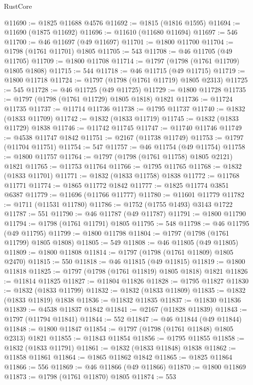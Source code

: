 \begin{lexlean}{RustCore}
\begin{coremodule}
@11690 := @1825 @11688 @4576
@11692 := @1815 (@1816 @1595)
@11694 := @11690 (@1875 @11692)
@11696 := @11610 (@11680 @11694)
@11697 := 546
@11700 := @46 @11697 (@49 @11697)
@11701 := @1800 @11700
@11704 := @1798 (@1761 @11701) @1805
@11705 := 543
@11708 := @46 @11705 (@49 @11705)
@11709 := @1800 @11708
@11714 := @1797 (@1798 (@1761 @11709) @1805 @1808)
@11715 := 544
@11718 := @46 @11715 (@49 @11715)
@11719 := @1800 @11718
@11724 := @1797 (@1798 (@1761 @11719) @1805 @2313)
@11725 := 545
@11728 := @46 @11725 (@49 @11725)
@11729 := @1800 @11728
@11735 := @1797 (@1798 (@1761 @11729) @1805 @1818) @1821
@11736 := @11724 @11735
@11737 := @11714 @11736
@11738 := @1795 @11737
@11740 := @1832 (@1833 @11709)
@11742 := @1832 (@1833 @11719)
@11745 := @1832 (@1833 @11729) @1838
@11746 := @11742 @11745
@11747 := @11740 @11746
@11749 := @4538 @11747 @1842
@11751 := @2167 (@11738 @11749)
@11753 := @1797 (@11704 @11751)
@11754 := 547
@11757 := @46 @11754 (@49 @11754)
@11758 := @1800 @11757
@11764 := @1797 (@1798 (@1761 @11758) @1805 @2121) @1821
@11765 := @11753 @11764
@11766 := @1795 @11765
@11768 := @1832 (@1833 @11701)
@11771 := @1832 (@1833 @11758) @1838
@11772 := @11768 @11771
@11774 := @1865 @11772 @1842
@11777 := @1825 @11774 @3851 @6387
@11779 := @11696 (@11766 @11777)
@11780 := @11601 @11779
@11782 := @1711 (@11531 @11780)
@11786 := @1752 (@1755 @1493) @3143 @1722
@11787 := 551
@11790 := @46 @11787 (@49 @11787)
@11791 := @1800 @11790
@11794 := @1798 (@1761 @11791) @1805
@11795 := 548
@11798 := @46 @11795 (@49 @11795)
@11799 := @1800 @11798
@11804 := @1797 (@1798 (@1761 @11799) @1805 @1808)
@11805 := 549
@11808 := @46 @11805 (@49 @11805)
@11809 := @1800 @11808
@11814 := @1797 (@1798 (@1761 @11809) @1805 @2470)
@11815 := 550
@11818 := @46 @11815 (@49 @11815)
@11819 := @1800 @11818
@11825 := @1797 (@1798 (@1761 @11819) @1805 @1818) @1821
@11826 := @11814 @11825
@11827 := @11804 @11826
@11828 := @1795 @11827
@11830 := @1832 (@1833 @11799)
@11832 := @1832 (@1833 @11809)
@11835 := @1832 (@1833 @11819) @1838
@11836 := @11832 @11835
@11837 := @11830 @11836
@11839 := @4538 @11837 @1842
@11841 := @2167 (@11828 @11839)
@11843 := @1797 (@11794 @11841)
@11844 := 552
@11847 := @46 @11844 (@49 @11844)
@11848 := @1800 @11847
@11854 := @1797 (@1798 (@1761 @11848) @1805 @2313) @1821
@11855 := @11843 @11854
@11856 := @1795 @11855
@11858 := @1832 (@1833 @11791)
@11861 := @1832 (@1833 @11848) @1838
@11862 := @11858 @11861
@11864 := @1865 @11862 @1842
@11865 := @1825 @11864
@11866 := 556
@11869 := @46 @11866 (@49 @11866)
@11870 := @1800 @11869
@11873 := @1798 (@1761 @11870) @1805
@11874 := 553

\end{coremodule}
\end{lexlean}
